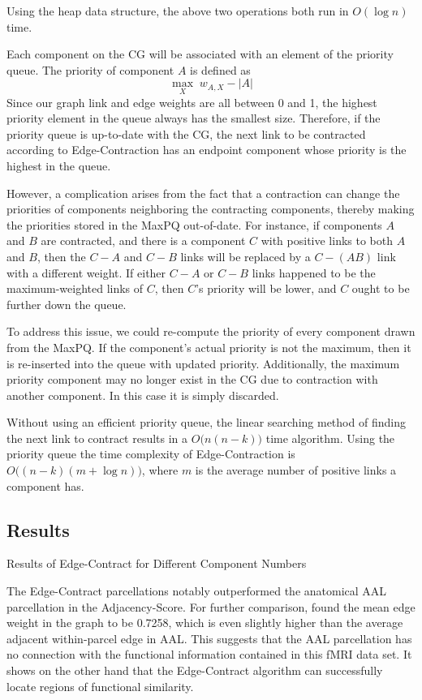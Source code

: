 Using the heap data structure, the above two operations both run in
$O(\log n)$ time.

Each component on the CG will be associated with an element of the
priority queue. The priority of component $A$ is defined as
\[ \max_{X}\;w_{A,X} - |A| \]
Since our graph link and edge weights are all between 0 and 1, the
highest priority element in the queue always has the smallest size.
Therefore, if the priority queue is up-to-date with the CG, the
next link to be contracted according to Edge-Contraction has
an endpoint component whose priority is the highest in the queue.

However, a complication arises from the fact that a contraction can
change the priorities of components neighboring the contracting
components, thereby making the priorities stored in the MaxPQ
out-of-date. For instance, if components $A$ and $B$ are contracted, and
there is a component $C$ with positive links to both $A$ and $B$, then
the $C-A$ and $C-B$ links will be replaced by a $C-(AB)$ link with a
different weight. If either $C-A$ or $C-B$ links happened to be the
maximum-weighted links of $C$, then $C$'s priority will be lower,
and $C$ ought to be further down the queue.

To address this issue, we could re-compute the priority of every
component drawn from the MaxPQ. If the component's actual priority is
not the maximum, then it is re-inserted into the queue with updated
priority. Additionally, the maximum priority component may no longer
exist in the CG due to contraction with another component. In this case
it is simply discarded.

Without using an efficient priority queue, the linear searching method
of finding the next link to contract results in a $O\big(n (n-k)\big)$
time algorithm. Using the priority queue the time complexity of
Edge-Contraction is $O \big((n - k) (m + \log n)\big)$, where $m$ is
the average number of positive links a component has.

\subsection{Results}

\begin{table}
\caption{Results of Edge-Contract for Different Component Numbers}
\label{4_ec}
\end{table}

The Edge-Contract parcellations notably outperformed the anatomical AAL
parcellation in the Adjacency-Score. For further comparison, found the
mean edge weight in the graph to be 0.7258, which is even slightly
higher than the average adjacent within-parcel edge in AAL. This
suggests that the AAL parcellation has no connection with the functional
information contained in this fMRI data set. It shows on the other
hand that the Edge-Contract algorithm can successfully locate regions of
functional similarity.

